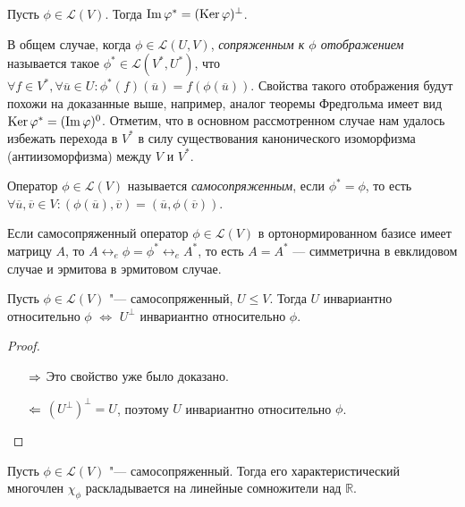 \begin{corollary}
	Пусть $\phi \in \mathcal{L}(V)$. Тогда $\operatorname{Im}{\varphi^*} = (\operatorname{Ker}{\varphi})^\perp$.
\end{corollary}

\begin{note}
	В общем случае, когда $\phi \in \mathcal{L}(U, V)$, \textit{сопряженным к $\phi$ отображением} называется такое $\phi^* \in \mathcal{L}(V^*, U^*)$, что $\forall f \in V^*, \forall \overline{u} \in U: \phi^*(f)(\overline{u}) = f(\phi(\overline{u}))$. Свойства такого отображения будут похожи на доказанные выше, например, аналог теоремы Фредгольма имеет вид $\operatorname{Ker}{\varphi^*} = (\operatorname{Im}{\varphi})^0$. Отметим, что в основном рассмотренном случае нам удалось избежать перехода в $V^*$ в силу существования канонического изоморфизма (антиизоморфизма) между $V$ и $V^*$.
\end{note}

\begin{definition}
	Оператор $\phi \in \mathcal{L}(V)$ называется \textit{самосопряженным}, если $\phi^* = \phi$, то есть $\forall \overline{u}, \overline{v} \in V: (\phi(\overline{u}), \overline{v}) = (\overline{u}, \phi(\overline{v}))$.
\end{definition}

\begin{note}
	Если самосопряженный оператор $\phi \in \mathcal{L}(V)$ в ортонормированном базисе имеет матрицу $A$, то $A \leftrightarrow_e \phi = \phi^* \leftrightarrow_e A^*$, то есть $A = A^*$ --- симметрична в евклидовом случае и эрмитова в эрмитовом случае.
\end{note}

\begin{proposition}
	Пусть $\phi \in \mathcal{L}(V)$ "--- самосопряженный, $U \le V$. Тогда $U$ инвариантно относительно $\phi$ $\Leftrightarrow$ $U^\perp$ инвариантно относительно $\phi$.
\end{proposition}

\begin{proof}~
	\begin{itemize}
		\item[$\Rightarrow$] Это свойство уже было доказано.
		\item[$\Leftarrow$] $(U^\perp)^\perp = U$, поэтому $U$ инвариантно относительно $\phi$.\qedhere
	\end{itemize}
\end{proof}

\begin{proposition}
	Пусть $\phi \in \mathcal{L}(V)$ "--- самосопряженный. Тогда его характеристический многочлен $\chi_\phi$ раскладывается на линейные сомножители над $\mathbb{R}$.
\end{proposition}

